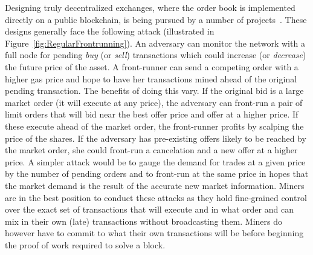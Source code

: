 Designing truly decentralized exchanges, where the order book is implemented directly on a public blockchain, is being pursued by a number of projects~\cite{inDEXgithub}. These designs generally face the following attack (illustrated in Figure~\ref{fig:RegularFrontrunning}). An adversary can monitor the network with a full node for pending \textit{buy} (or \textit{sell}) transactions which could increase (or \textit{decrease}) the future price of the asset. A front-runner can send a competing order with a higher gas price and hope to have her transactions mined ahead of the original pending transaction. The benefits of doing this vary. If the original bid is a large market order (\ie it will execute at any price), the adversary can front-run a pair of limit orders that will bid near the best offer price and offer at a higher price. If these execute ahead of the market order, the front-runner profits by scalping the price of the shares. If the adversary has pre-existing offers likely to be reached by the market order, she could front-run a cancelation and a new offer at a higher price. A simpler attack would be to gauge the demand for trades at a given price by the number of pending orders and to front-run at the same price in hopes that the market demand is the result of the accurate new market information. Miners are in the best position to conduct these attacks as they hold fine-grained control over the exact set of transactions that will execute and in what order and can mix in their own (late) transactions without broadcasting them. Miners do however have to commit to what their own transactions will be before beginning the proof of work required to solve a block.


